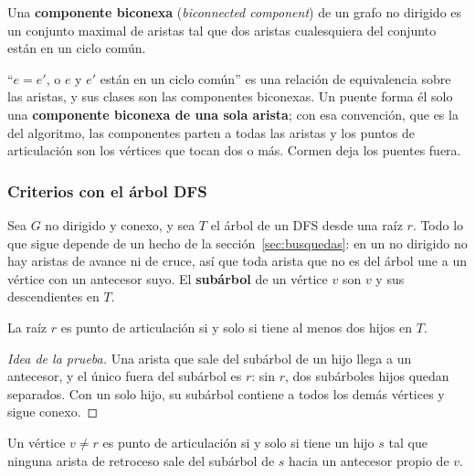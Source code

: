 \documentclass[11pt,letterpaper]{article}
\begin{document}
\begin{definicion}
  \label{def:biconexa}
  Una \textbf{componente biconexa} (\textit{biconnected component}) de
  un grafo no dirigido es un conjunto maximal de aristas tal que dos
  aristas cualesquiera del conjunto están en un ciclo común.
\end{definicion}

``$e = e'$, o $e$ y $e'$ están en un ciclo común'' es una relación de
equivalencia sobre las aristas, y sus clases son las componentes
biconexas. Un puente forma él solo una \textbf{componente biconexa de
una sola arista}; con esa convención, que es la del algoritmo, las
componentes parten a todas las aristas y los puntos de articulación
son los vértices que tocan dos o más. Cormen deja los puentes fuera.

\subsubsection*{Criterios con el árbol DFS}

Sea $G$ no dirigido y conexo, y sea $T$ el árbol de un DFS desde una
raíz $r$. Todo lo que sigue depende de un hecho de la
sección~\ref{sec:busquedas}: en un no dirigido no hay aristas de avance
ni de cruce, así que toda arista que no es del árbol une a un vértice
con un antecesor suyo. El \textbf{subárbol} de un vértice $v$ son $v$ y
sus descendientes en $T$.

\begin{proposicion}
  \label{prop:raiz-articulacion}
  La raíz $r$ es punto de articulación si y solo si tiene al menos dos
  hijos en $T$.
\end{proposicion}

\begin{proof}[Idea de la prueba]
  Una arista que sale del subárbol de un hijo llega a un antecesor, y
  el único fuera del subárbol es $r$: sin $r$, dos subárboles hijos
  quedan separados. Con un solo hijo, su subárbol contiene a todos los
  demás vértices y sigue conexo.
\end{proof}

\begin{proposicion}
  \label{prop:hijo-articulacion}
  Un vértice $v \neq r$ es punto de articulación si y solo si tiene un
  hijo $s$ tal que ninguna arista de retroceso sale del subárbol de $s$
  hacia un antecesor propio de $v$.
\end{proposicion}
\end{document}
